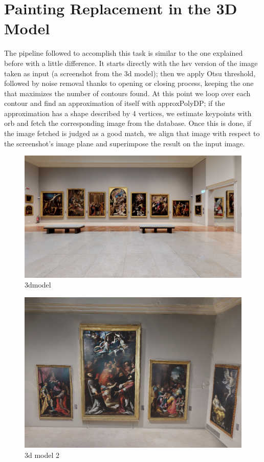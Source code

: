 \documentclass[conference]{IEEEtran}
\begin{document}
\section{Painting Replacement in the 3D Model}
The pipeline followed to accomplish this task is similar to the one explained before with a little difference. It starts directly with the hsv version of the image taken as input (a screenshot from the 3d model); then we apply Otsu threshold, followed by noise removal thanks to opening or closing process, keeping the one that maximizes the number of contours found. At this point we loop over each contour and find an approximation of itself with approxPolyDP; if the approximation has a shape described by 4 vertices, we estimate keypoints with orb and fetch the corresponding image from the database. Once this is done, if the image fetched is judged as a good match, we align that image with respect to the screenshot’s image plane and superimpose the result on the input image.

\begin{figure}[htbp]
\centerline{\includegraphics[width=0.8\columnwidth]{../screenshots_3d_model/screenshot_01.jpg}}
\caption{3dmodel}
\label{fig_3d_model}
\end{figure}

\begin{figure}[htbp]
\centerline{\includegraphics[width=0.8\columnwidth]{../screenshots_3d_model/screenshot_03.png}}
\caption{3d model 2}
\label{fig_3d_model_2}
\end{figure}
\end{document}
